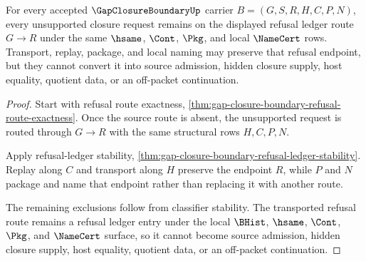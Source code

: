 \begin{theorem}
\label{thm:gap-closure-boundary-refusal-route-stability}
For every accepted $\GapClosureBoundaryUp$ carrier $B=(G,S,R,H,C,P,N)$, every unsupported closure request remains on the displayed refusal ledger route $G \longrightarrow R$ under the same $\hsame$, $\Cont$, $\Pkg$, and local $\NameCert$ rows. Transport, replay, package, and local naming may preserve that refusal endpoint, but they cannot convert it into source admission, hidden closure supply, host equality, quotient data, or an off-packet continuation.
\end{theorem}
\begin{proof}
Start with refusal route exactness, \autoref{thm:gap-closure-boundary-refusal-route-exactness}. Once the source route is absent, the unsupported request is routed through $G \longrightarrow R$ with the same structural rows $H,C,P,N$.

Apply refusal-ledger stability, \autoref{thm:gap-closure-boundary-refusal-ledger-stability}. Replay along $C$ and transport along $H$ preserve the endpoint $R$, while $P$ and $N$ package and name that endpoint rather than replacing it with another route.

The remaining exclusions follow from classifier stability. The transported refusal route remains a refusal ledger entry under the local $\BHist$, $\hsame$, $\Cont$, $\Pkg$, and $\NameCert$ surface, so it cannot become source admission, hidden closure supply, host equality, quotient data, or an off-packet continuation.
\end{proof}

